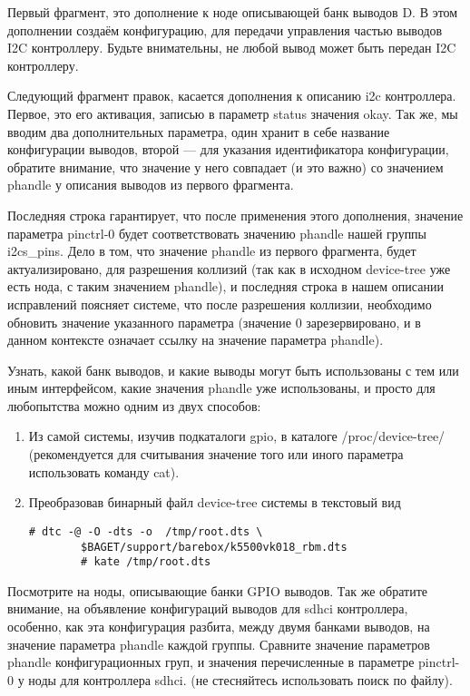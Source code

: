 Первый фрагмент, это дополнение к ноде описывающей банк выводов D. В этом дополнении создаём конфигурацию, для передачи управления частью выводов I2C контроллеру. Будьте внимательны, не любой вывод может быть передан I2C контроллеру. 

Следующий фрагмент правок, касается дополнения к описанию i2c контроллера. Первое, это его активация, записью в параметр status значения okay. Так же, мы вводим два дополнительных параметра, один хранит в себе название конфигурации выводов, второй — для указания идентификатора конфигурации, обратите внимание, что значение у него совпадает (и это важно) со значением phandle у описания выводов из первого фрагмента.

Последняя строка гарантирует, что после применения этого дополнения, значение параметра pinctrl-0 будет соответствовать значению phandle нашей группы i2cs\_pins. Дело в том, что значение phandle из первого фрагмента, будет  актуализировано, для разрешения коллизий (так как в исходном device-tree уже есть нода, с таким значением phandle), и последняя строка в нашем описании исправлений поясняет системе, что после разрешения коллизии, необходимо обновить значение указанного параметра (значение 0 зарезервировано, и в данном контексте означает ссылку на значение параметра phandle).  

Узнать, какой банк выводов, и какие выводы могут быть использованы с тем или иным интерфейсом, какие значения phandle уже использованы, и просто для любопытства можно одним из двух способов:

\begin{enumerate}
	\item Из самой системы, изучив подкаталоги gpio, в каталоге /proc/device-tree/ (рекомендуется для считывания значение того или иного параметра использовать команду cat). 
	
	\item Преобразовав бинарный файл device-tree системы в текстовый вид 
	\begin{lstlisting}[style=bash]
		# dtc -@ -O -dts -o  /tmp/root.dts \
		$BAGET/support/barebox/k5500vk018_rbm.dts
		# kate /tmp/root.dts
	\end{lstlisting}
\end{enumerate}

Посмотрите на ноды, описывающие банки GPIO выводов. Так же обратите внимание, на объявление конфигураций выводов для sdhci контроллера, особенно, как эта конфигурация разбита, между двумя банками выводов, на значение параметра phandle каждой группы. Сравните значение параметров phandle конфигурационных груп, и значения перечисленные в параметре pinctrl-0 у ноды для контроллера  sdhci. (не стесняйтесь использовать поиск по файлу).

